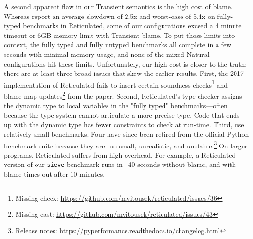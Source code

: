 A second apparent flaw in our Transient semantics is the high cost of blame.
Whereas \citet{vss-popl-2017} report an average slowdown of 2.5x and
worst-case of 5.4x on fully-typed benchmarks in Reticulated,
some of our configurations exceed a 4 minute timeout or 6GB memory limit with Transient blame.
To put those limits into context, the fully typed and fully untyped benchmarks all complete in a few seconds with minimal memory usage, and none of the mixed Natural configurations hit these limits.
Unfortunately, our high cost is closer to the truth;
 there are at least three broad issues that skew the earlier results.
First, the 2017 implementation of Reticulated fails to insert certain
 soundness checks\footnote{Missing check: \url{https://github.com/mvitousek/reticulated/issues/36}}
 and blame-map updates\footnote{Missing cast: \url{https://github.com/mvitousek/reticulated/issues/43}}
 from the paper.
Second, Reticulated's type checker assigns the dynamic type to local
 variables in the "fully typed" benchmarks---often because the type system
 cannot articulate a more precise type.
Code that ends up with the dynamic type has fewer constraints to check at run-time.
Third, \citet{vss-popl-2017} use relatively small benchmarks.
Four have since been retired from the official Python benchmark suite
 because they are too small, unrealistic, and unstable.\footnote{Release notes: \url{https://pyperformance.readthedocs.io/changelog.html}}
On larger programs, Reticulated suffers from high overhead.
For example, a Reticulated version of our \texttt{sieve} benchmark runs in
 ~40 seconds without blame, and with blame times out after 10 minutes.




